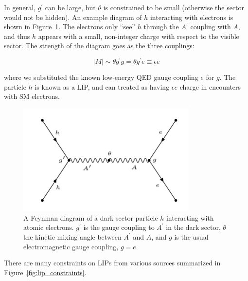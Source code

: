In general, $g^{\prime}$ can be large, but $\theta$ is constrained to be small (otherwise the sector would not be hidden). An example diagram of $h$ interacting with electrons is shown in Figure~\ref{fig:diagram}. The electrons only ``see'' $h$ through the $A^{\prime}$ coupling with $A$, and thus $h$ appears with a small, non-integer charge with respect to the visible sector. The strength of the diagram goes as the three couplings:

\begin{equation}
|M| \sim  \theta g^{\prime} g = \theta g^{\prime} e \equiv \epsilon e
\end{equation}

where we substituted the known low-energy \ac{QED} gauge coupling $e$ for $g$. The particle $h$ is known as a \ac{LIP}, and can treated as having $\epsilon e$ charge in encounters with \ac{SM} electrons. 


\begin{figure}[htbp]
\begin{center}
\includegraphics[width=0.8\textwidth]{figures/theory/diagram.png}
\caption{ A Feynman diagram of a dark sector particle $h$ interacting with atomic electrons. $g^{\prime}$ is the gauge coupling to $A^{\prime}$ in the dark sector, $\theta$ the kinetic mixing angle between $A^{\prime}$ and $A$, and $g$ is the usual electromagnetic gauge coupling, $g=e$.  }
\label{fig:diagram}
\end{center}
\end{figure}




There are many constraints on \ac{LIP}s from various sources summarized in Figure~\ref{fig:lip_constraints}.


